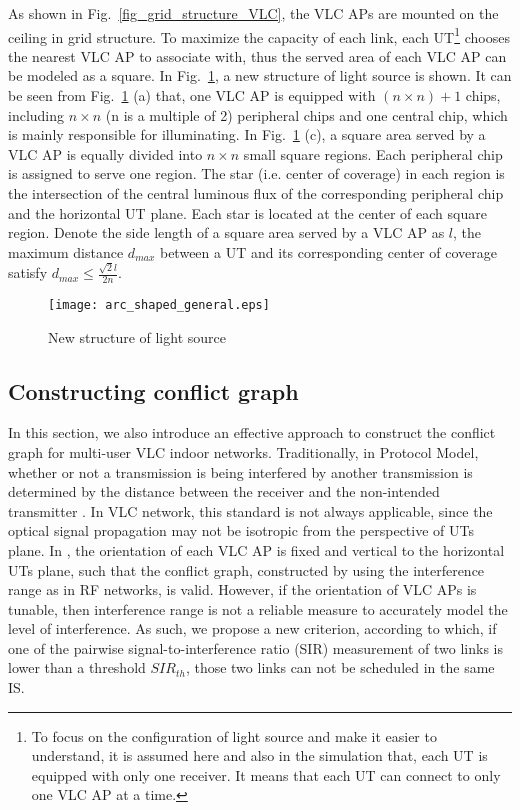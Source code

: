 \documentclass[10pt,journal]{IEEEtran}
\begin{document}
As shown in Fig.~\ref{fig_grid_structure_VLC}, the VLC APs are mounted on the ceiling in grid structure. To maximize the capacity of each link, each UT\footnote{To focus on the configuration of light source and make it easier to understand, it is assumed here and also in the simulation that, each UT is equipped with only one receiver. It means that each UT can connect to only one VLC AP at a time.} chooses the nearest VLC AP to associate with, thus the served area of each VLC AP can be modeled as a square. In Fig.~\ref{fig_acr_shaped_general}, a new structure of light source is shown. It can be seen from Fig.~\ref{fig_acr_shaped_general} (a) that, one VLC AP is equipped with $(n\times n)+1$ chips, including $n\times n$ (n is a multiple of 2) peripheral chips and one central chip, which is mainly responsible for illuminating.  In Fig.~\ref{fig_acr_shaped_general} (c), a square area served by a VLC AP is equally divided into $n\times n$ small square regions. Each peripheral chip is assigned to serve one region. The star (i.e. center of coverage) in each region is the intersection of the central luminous flux of the corresponding peripheral chip and the horizontal UT plane. Each star is located at the center of each square region. Denote the side length of a square area served by a VLC AP as $l$, the maximum distance $d_{max}$ between a UT and its corresponding center of coverage satisfy $d_{max}\leq \frac{\sqrt{2}l}{2n}$.

\begin{figure}
\centering
\texttt{[image: arc\_shaped\_general.eps]}
\caption{New structure of light source}
\vspace{-5pt}
\label{fig_acr_shaped_general}
\end{figure}





\subsection{Constructing conflict graph}
In this section, we also introduce an effective approach to construct the conflict graph for multi-user VLC indoor networks. Traditionally, in Protocol Model, whether or not a transmission is being interfered by another transmission is determined by the distance between the receiver and the non-intended transmitter \cite{gupta2000capacity,shi2013bridging,shi2007optimal}. In VLC network, this standard is not always applicable, since the optical signal propagation may not be isotropic from the perspective of UTs plane. In \cite {tao2015scheduling}, the orientation of each VLC AP is fixed and vertical to the horizontal UTs plane, such that the conflict graph, constructed by using the interference range \cite{gupta2000capacity} as in RF networks, is valid. However, if the orientation of VLC APs is tunable, then interference range is not a reliable measure to accurately model the level of interference. As such, we propose a new criterion, according to which, if one of the pairwise signal-to-interference ratio (SIR) measurement of two links is lower than a threshold $SIR_{th}$, those two links can not be scheduled in the same IS.
\end{document}
